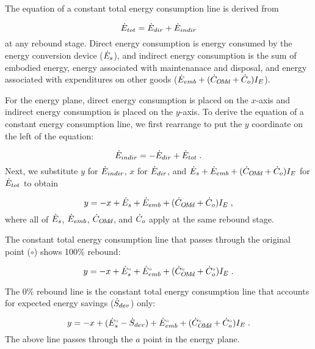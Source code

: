 The equation of a constant total energy consumption line is derived from 

\begin{equation}
  \dot{E}_{tot} = \dot{E}_{dir} + \dot{E}_{indir}
\end{equation}
%
at any rebound stage.
Direct energy consumption is energy consumed by the energy conversion device
($\dot{E}_s$), and 
indirect energy consumption is the sum of embodied energy, 
energy associated with maintenanace and disposal, and energy associated 
with expenditures on other goods
($\dot{E}_{emb} + (\dot{C}_{O\!M\!d} + \dot{C}_o) I_E$).

For the energy plane, 
direct energy consumption is placed on the $x$-axis and 
indirect energy consumption is placed on the $y$-axis.
To derive the equation of a constant energy consumption line, 
we first rearrange to put the $y$ coordinate on the left of the equation:

\begin{equation}
  \dot{E}_{indir} = - \dot{E}_{dir} + \dot{E}_{tot} \; .
\end{equation}
%
Next, we substitute $y$ for $\dot{E}_{indir}$,
$x$ for $\dot{E}_{dir}$, and 
$\dot{E}_s + \dot{E}_{emb} + (\dot{C}_{O\!M\!d} + \dot{C}_o) I_E$ for $\dot{E}_{tot}$
to obtain

\begin{equation}
  y = -x + \dot{E}_s + \dot{E}_{emb} + (\dot{C}_{O\!M\!d} + \dot{C}_o) I_E \; ,
\end{equation}
%
where all of $\dot{E}_s$, $\dot{E}_{emb}$, $\dot{C}_{O\!M\!d}$, and $\dot{C}_o$
apply at the same rebound stage.

The constant total energy consumption line 
that passes through the original point ($\circ$)
shows 100\% rebound:

\begin{equation}
  y = -x + {}{\dot{E}}^{\scriptscriptstyle \circ}_s + {}{\dot{E}}^{\scriptscriptstyle \circ}_{emb} + ({}{\dot{C}}^{\scriptscriptstyle \circ}_{O\!M\!d} + {}{\dot{C}}^{\scriptscriptstyle \circ}_o) I_E \; .
\end{equation}

The 0\% rebound line is the constant total energy consumption line 
that accounts for expected energy savings ($\dot{S}_{dev}$) only:

\begin{equation}
  y = -x + ({}{\dot{E}}^{\scriptscriptstyle \circ}_s - \dot{S}_{dev})
          + {}{\dot{E}}^{\scriptscriptstyle \circ}_{emb} + ({}{\dot{C}}^{\scriptscriptstyle \circ}_{O\!M\!d} + {}{\dot{C}}^{\scriptscriptstyle \circ}_o) I_E \; .
\end{equation}
%
The above line passes through the $a$ point in the energy plane.



